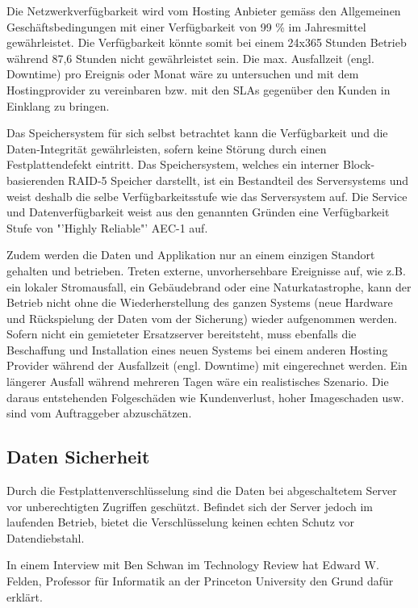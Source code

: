 Die Netzwerkverfügbarkeit wird vom Hosting Anbieter gemäss den Allgemeinen Geschäftsbedingungen \cite{Ag2009} mit einer Verfügbarkeit von 99 \% im Jahresmittel gewährleistet. Die Verfügbarkeit könnte somit bei einem 24x365 Stunden Betrieb während 87,6 Stunden nicht gewährleistet sein. Die max. Ausfallzeit (engl. Downtime) pro Ereignis oder Monat wäre zu untersuchen und mit dem Hostingprovider zu vereinbaren bzw. mit den SLAs gegenüber den Kunden in Einklang zu bringen.

Das Speichersystem für sich selbst betrachtet kann die Verfügbarkeit und die Daten-Integrität gewährleisten, sofern keine Störung durch einen Festplattendefekt eintritt. Das Speichersystem, welches ein interner Block-basierenden RAID-5 Speicher darstellt, ist ein Bestandteil des Serversystems und weist deshalb die selbe Verfügbarkeitsstufe wie das Serversystem auf. Die Service und Datenverfügbarkeit weist aus den genannten Gründen eine Verfügbarkeit Stufe von "'Highly Reliable"' AEC-1 auf.

Zudem werden die Daten und Applikation nur an einem einzigen Standort gehalten und betrieben. Treten externe, unvorhersehbare Ereignisse auf, wie z.B. ein lokaler Stromausfall, ein Gebäudebrand oder eine Naturkatastrophe, kann der Betrieb nicht ohne die Wiederherstellung des ganzen Systems (neue Hardware und Rückspielung der Daten vom der Sicherung) wieder aufgenommen werden. Sofern nicht ein gemieteter Ersatzserver bereitsteht, muss ebenfalls die Beschaffung und Installation eines neuen Systems bei einem anderen Hosting Provider während der Ausfallzeit (engl. Downtime) mit eingerechnet werden. Ein längerer Ausfall während mehreren Tagen wäre ein realistisches Szenario. Die daraus entstehenden Folgeschäden wie Kundenverlust, hoher Imageschaden usw. sind vom Auftraggeber abzuschätzen.

\subsection{Daten Sicherheit}
Durch die Festplattenverschlüsselung sind die Daten bei abgeschaltetem Server vor unberechtigten Zugriffen geschützt. Befindet sich der Server jedoch im laufenden Betrieb, bietet die Verschlüsselung keinen echten Schutz vor Datendiebstahl. 

In einem Interview mit Ben Schwan im Technology Review hat Edward W. Felden, Professor für Informatik an der Princeton University den Grund dafür erklärt. 

